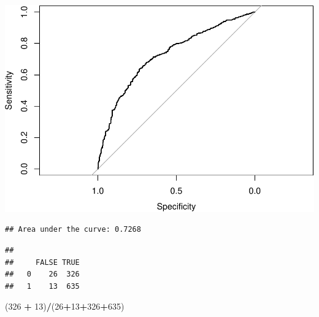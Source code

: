 \documentclass[]{article}
\newenvironment{Shaded}{\begin{snugshade}}{\end{snugshade}}
\newcommand{\DecValTok}[1]{\textcolor[rgb]{0.00,0.00,0.81}{#1}}
\newcommand{\FloatTok}[1]{\textcolor[rgb]{0.00,0.00,0.81}{#1}}
\newcommand{\KeywordTok}[1]{\textcolor[rgb]{0.13,0.29,0.53}{\textbf{#1}}}
\newcommand{\NormalTok}[1]{#1}
\newcommand{\OperatorTok}[1]{\textcolor[rgb]{0.81,0.36,0.00}{\textbf{#1}}}
\newcommand{\StringTok}[1]{\textcolor[rgb]{0.31,0.60,0.02}{#1}}
\begin{document}
\includegraphics{Project_files/figure-latex/unnamed-chunk-15-1.pdf}

\begin{Shaded}
\end{Shaded}

\begin{verbatim}
## Area under the curve: 0.7268
\end{verbatim}

\begin{Shaded}
\end{Shaded}

\begin{verbatim}
##    
##     FALSE TRUE
##   0    26  326
##   1    13  635
\end{verbatim}

\begin{Shaded}
\begin{Highlighting}[]
\NormalTok{(}\DecValTok{326} \OperatorTok{+}\StringTok{ }\DecValTok{13}\NormalTok{)}\OperatorTok{/}\NormalTok{(}\DecValTok{26}\OperatorTok{+}\DecValTok{13}\OperatorTok{+}\DecValTok{326}\OperatorTok{+}\DecValTok{635}\NormalTok{)}
\end{Highlighting}
\end{Shaded}
\end{document}
